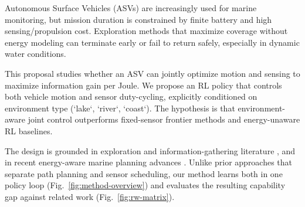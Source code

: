 Autonomous Surface Vehicles (ASVs) are increasingly used for marine monitoring, but mission duration is constrained by finite battery and high sensing/propulsion cost. Exploration methods that maximize coverage without energy modeling can terminate early or fail to return safely, especially in dynamic water conditions.

This proposal studies whether an ASV can jointly optimize motion and sensing to maximize information gain per Joule. We propose an RL policy that controls both vehicle motion and sensor duty-cycling, explicitly conditioned on environment type (`lake`, `river`, `coast`). The hypothesis is that environment-aware joint control outperforms fixed-sensor frontier methods and energy-unaware RL baselines.

The design is grounded in exploration and information-gathering literature \cite{yamauchi1997frontier,hollinger2014sampling}, and in recent energy-aware marine planning advances \cite{yang2021energyoptimal,cooperbaldock2025wake,gadhvi2025khalasi}. Unlike prior approaches that separate path planning and sensor scheduling, our method learns both in one policy loop (Fig.~\ref{fig:method-overview}) and evaluates the resulting capability gap against related work (Fig.~\ref{fig:rw-matrix}).
